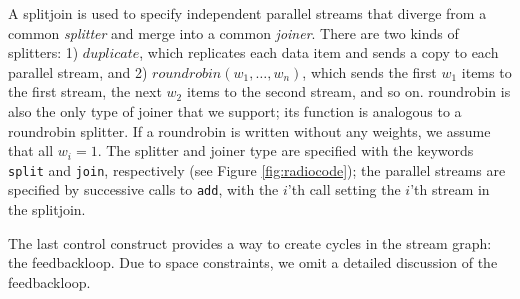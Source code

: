 A splitjoin is used to specify independent parallel streams that
diverge from a common {\it splitter} and merge into a common {\it
joiner}.  There are two kinds of splitters: 1) $duplicate$, which
replicates each data item and sends a copy to each parallel stream,
and 2) $roundrobin(w_1, \dots, w_n)$, which sends the first $w_1$
items to the first stream, the next $w_2$ items to the second stream,
and so on.  roundrobin is also the only type of joiner that we
support; its function is analogous to a roundrobin splitter.  If a
roundrobin is written without any weights, we assume that all $w_i =
1$.  The splitter and joiner type are specified with the keywords {\tt
split} and {\tt join}, respectively (see Figure \ref{fig:radiocode});
the parallel streams are specified by successive calls to {\tt add},
with the $i$'th call setting the $i$'th stream in the splitjoin.

The last control construct provides a way to create cycles in the
stream graph: the feedbackloop.  Due to space constraints, we omit a
detailed discussion of the feedbackloop.